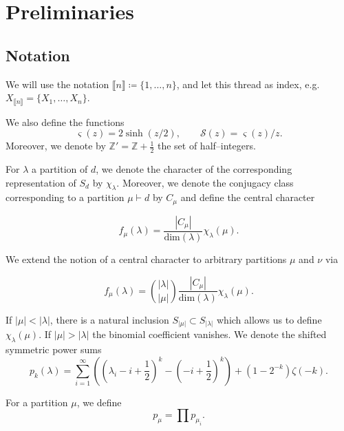 \documentclass[10pt,a4paper,oneside,no-math,reqno]{amsart}%
\theoremstyle{plain}
\theoremstyle{definition}
\theoremstyle{remark}
\numberwithin{equation}{section}
\newcommand{\mb}[1]{\mathbb{#1}}
\newcommand{\1}{\mathds{1}}
\newcommand{\Z}{\mb{Z}}
\newcommand{\<}{\langle}
\renewcommand{\>}{\rangle}
\begin{document}
\section{Preliminaries}\label{Preliminaries}

\subsection{Notation}

We will use the notation $ \llbracket n \rrbracket \coloneqq \{ 1, \dotsc, n\}$, and let this thread as index, e.g. $ X_{\llbracket n \rrbracket} = \{ X_1, \dotsc, X_n \}$.

We also define the functions
\begin{equation}
    \varsigma(z)
    =
    2\sinh(z/2) , 
    \qquad 
    \mathcal{S}(z)
    =
    \varsigma(z)/z .
\end{equation} 
Moreover, we denote by $\mathbb{Z}' = \Z + \frac{1}{2}$ the set of half--integers.

For $\lambda$ a partition of $d$, we denote the character of the corresponding representation of $S_d$ by $\chi_\lambda$. Moreover, we denote the conjugacy class corresponding to a partition $\mu\vdash d$ by $C_\mu$ and define the central character

\begin{equation}
    f_\mu(\lambda)
    =
    \frac{|C_\mu|}{\mathrm{dim}(\lambda)} \chi_\lambda(\mu).
\end{equation}

We extend the notion of a central character to arbitrary partitions $\mu$ and $\nu$ via

\begin{equation}
    f_\mu(\lambda)
    =
    \binom{|\lambda|}{|\mu|} \frac{|C_\mu|}{\mathrm{dim}(\lambda)} \chi_\lambda(\mu).
\end{equation}

If $|\mu|<|\lambda|$, there is a natural inclusion $S_{|\mu|}\subset S_{|\lambda|}$ which allows us to define $\chi_\lambda(\mu)$. If $|\mu|>|\lambda|$ the binomial coefficient vanishes.
 We denote the shifted symmetric power sums 
 \begin{equation}
     p_k(\lambda)
     =
     \sum_{i=1}^\infty \left( (\lambda_i-i+\frac{1}{2})^k-(-i+\frac{1}{2})^k\right) + (1-2^{-k}) \zeta(-k).   
 \end{equation}

 For a partition $\mu$, we define
 \begin{equation}
     p_\mu
     =
     \prod p_{\mu_i}.
 \end{equation}
\end{document}
